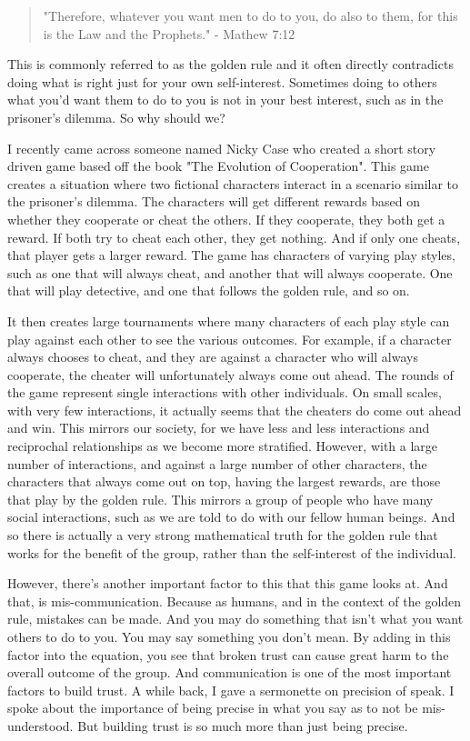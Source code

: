 \documentclass[10pt]{article}
\begin{document}
\begin{multicols}{2}
\begin{quotation}
"Therefore, whatever you want men to do to you, do also to them, for this is the Law and the Prophets." - Mathew 7:12
\end{quotation}

This is commonly referred to as the golden rule and it often directly contradicts doing what is right just for your own self-interest. Sometimes doing to others what you'd want them to do to you is not in your best interest, such as in the prisoner's dilemma. So why should we?

I recently came across someone named Nicky Case who created a short story driven game based off the book "The Evolution of Cooperation". This game creates a situation where two fictional characters interact in a scenario similar to the prisoner's dilemma. The characters will get different rewards based on whether they cooperate or cheat the others. If they cooperate, they both get a reward. If both try to cheat each other, they get nothing. And if only one cheats, that player gets a larger reward. The game has characters of varying play styles, such as one that will always cheat, and another that will always cooperate. One that will play detective, and one that follows the golden rule, and so on. 

It then creates large tournaments where many characters of each play style can play against each other to see the various outcomes. For example, if a character always chooses to cheat, and they are against a character who will always cooperate, the cheater will unfortunately always come out ahead. The rounds of the game represent single interactions with other individuals. On small scales, with very few interactions, it actually seems that the cheaters do come out ahead and win. This mirrors our society, for we have less and less interactions and reciprochal relationships as we become more stratified. However, with a large number of interactions, and against a large number of other characters, the characters that always come out on top, having the largest rewards, are those that play by the golden rule. This mirrors a group of people who have many social interactions, such as we are told to do with our fellow human beings. And so there is actually a very strong mathematical truth for the golden rule that works for the benefit of the group, rather than the self-interest of the individual.

However, there's another important factor to this that this game looks at. And that, is mis-communication. Because as humans, and in the context of the golden rule, mistakes can be made. And you may do something that isn't what you want others to do to you. You may say something you don't mean. By adding in this factor into the equation, you see that broken trust can cause great harm to the overall outcome of the group. And communication is one of the most important factors to build trust. A while back, I gave a sermonette on precision of speak. I spoke about the importance of being precise in what you say as to not be mis-understood. But building trust is so much more than just being precise.


\end{multicols}
\end{document}
